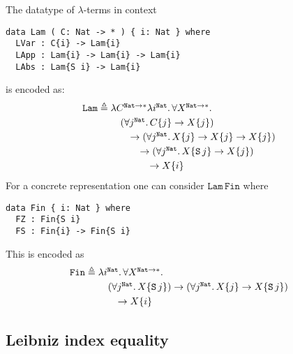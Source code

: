 \begin{example}
The datatype of \mbox{$\lambda$-terms} in context 
\begin{verbatim}
data Lam ( C: Nat -> * ) { i: Nat } where
  LVar : C{i} -> Lam{i}
  LApp : Lam{i} -> Lam{i} -> Lam{i}
  LAbs : Lam{S i} -> Lam{i}
\end{verbatim}
is encoded as:
\[
\mathtt{Lam} \triangleq
\!\!\!
\begin{array}[t]{l}
\lambda C^{\mathtt{Nat}\to*}
\lambda i^\mathtt{Nat}.\,\forall X^{\mathtt{Nat}\to*}.
\\[1mm]
\quad
  (\forall j^\mathtt{Nat}.\,C\{j\} \to X\{j\})
\\[1mm]
\quad\quad
 \to(\forall j^\mathtt{Nat}.\,X\{j\} \to X\{j\} \to X\{j\})
\\[1mm]
\quad\quad\quad
\to(\forall j^\mathtt{Nat}.\,X\{\mathtt S\, j\} \to X\{j\})
\\[1mm]
\quad\quad\quad\quad
  \to X\{i\}
\end{array}
\]
For a concrete representation one can consider
$\mathtt{Lam}\,\mathtt{Fin}$ where
\begin{verbatim}
data Fin { i: Nat } where
  FZ : Fin{S i}
  FS : Fin{i} -> Fin{S i}
\end{verbatim}
This is encoded as
\[
\mathtt{Fin}\triangleq
\!\!\!
\begin{array}[t]{l}
\lambda i^{\mathtt{Nat}}.\,\forall X^{\mathtt{Nat}\to*}.\,
\\[1mm]
\quad 
(\forall j^\mathtt{Nat}.\, X\{\mathtt S\, j\})
	\to (\forall j^\mathtt{Nat}.\, X\{j\}\to X\{\mathtt S\,j\})
\\[1mm]
	\qquad\to X\{i\}
\end{array}
\]
\end{example}
\subsection{Leibniz index equality}
\label{Leibniz}

